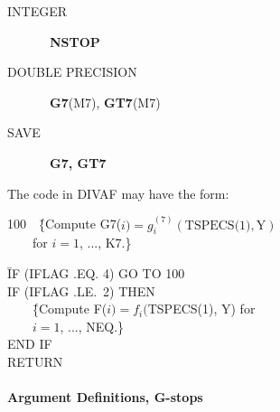 \documentclass[twoside]{MATH77}
\begin{document}
\begin{description}
\item[INTEGER] \ {\bf NSTOP}

\item[DOUBLE PRECISION]  \ {\bf G7}(M7), {\bf GT7}(M7)

\item[SAVE]  \ {\bf G7, GT7}
\end{description}

The code in DIVAF may have the form:

\begin{tabbing}
100\ \ \=\{Compute G7($i) = g^{(7)}_i(\text{TSPECS(1)},\text{Y})$\\
\>\ \ \ \ for $i = 1$, ..., K7.\}
\end{tabbing}

\hspace{.31in}\vspace{2pt}%

\begin{tabbing}
\phantom{100 }\=IF (IFLAG .EQ. 4) GO TO 100\\

\>IF (IFLAG .LE.\ 2) THEN\\

\>\ \ \ \ \=\{Compute F($i) = f_i($TSPECS(1), Y) for\\
\>\>\ \ \ \ $i = 1$, ..., NEQ.\}\\

\>END IF\\

\>RETURN
\end{tabbing}

\paragraph{Argument Definitions, G-stops}
\end{document}
